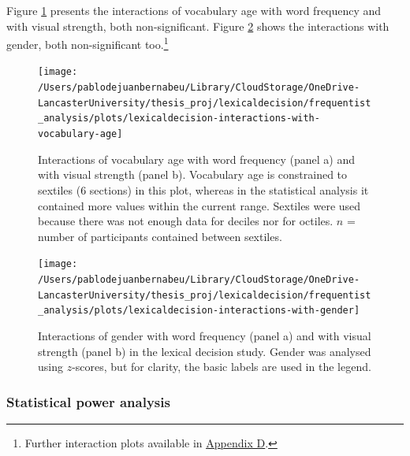 \documentclass[
  12pt,
  man,floatsintext]{apa7}
\begin{document}
Figure \ref{fig:lexicaldecision-interactions-with-vocabulary-age} presents the interactions of vocabulary age with word frequency and with visual strength, both non-significant. Figure \ref{fig:lexicaldecision-interactions-with-gender} shows the interactions with gender, both non-significant too.\footnote{Further interaction plots available in \protect\hyperlink{appendix-D-interaction-plots}{\underline{Appendix D}}.}



\begin{figure}

{\centering \texttt{[image: /Users/pablodejuanbernabeu/Library/CloudStorage/OneDrive-LancasterUniversity/thesis\_proj/lexicaldecision/frequentist\_analysis/plots/lexicaldecision-interactions-with-vocabulary-age]} 

}

\caption{Interactions of vocabulary age with word frequency (panel a) and with visual strength (panel b). Vocabulary age is constrained to sextiles (6 sections) in this plot, whereas in the statistical analysis it contained more values within the current range. Sextiles were used because there was not enough data for deciles nor for octiles. \(n\) = number of participants contained between sextiles.}\label{fig:lexicaldecision-interactions-with-vocabulary-age}
\end{figure}

\begin{figure}

{\centering \texttt{[image: /Users/pablodejuanbernabeu/Library/CloudStorage/OneDrive-LancasterUniversity/thesis\_proj/lexicaldecision/frequentist\_analysis/plots/lexicaldecision-interactions-with-gender]} 

}

\caption{Interactions of gender with word frequency (panel a) and with visual strength (panel b) in the lexical decision study. Gender was analysed using $z$-scores, but for clarity, the basic labels are used in the legend.}\label{fig:lexicaldecision-interactions-with-gender}
\end{figure}

\hypertarget{statistical-power-analysis-6}{%
\subsubsection{Statistical power analysis}\label{statistical-power-analysis-6}}
\end{document}

